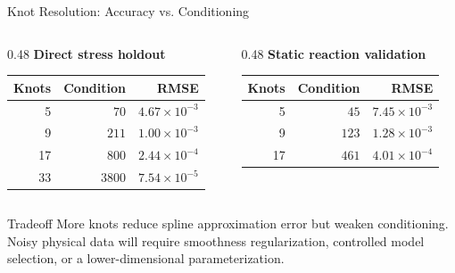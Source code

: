 \documentclass[aspectratio=169,10pt]{beamer}
\begin{document}
\begin{frame}{Knot Resolution: Accuracy vs. Conditioning}
  \small
  \begin{columns}[T,onlytextwidth]
    \begin{column}{0.48\linewidth}
      \centering
      \textbf{Direct stress holdout}

      \vspace{0.3em}
      \begin{tabular}{rrr}
        \toprule
        Knots & Condition & RMSE \\
        \midrule
        5 & $70$ & $4.67\times10^{-3}$ \\
        9 & $211$ & $1.00\times10^{-3}$ \\
        17 & $800$ & $2.44\times10^{-4}$ \\
        33 & $3800$ & $7.54\times10^{-5}$ \\
        \bottomrule
      \end{tabular}
    \end{column}
    \begin{column}{0.48\linewidth}
      \centering
      \textbf{Static reaction validation}

      \vspace{0.3em}
      \begin{tabular}{rrr}
        \toprule
        Knots & Condition & RMSE \\
        \midrule
        5 & $45$ & $7.45\times10^{-3}$ \\
        9 & $123$ & $1.28\times10^{-3}$ \\
        17 & $461$ & $4.01\times10^{-4}$ \\
        \bottomrule
      \end{tabular}
    \end{column}
  \end{columns}

  \vspace{0.9em}
  \begin{alertblock}{Tradeoff}
    More knots reduce spline approximation error but weaken conditioning.
    Noisy physical data will require smoothness regularization, controlled
    model selection, or a lower-dimensional parameterization.
  \end{alertblock}
\end{frame}
\end{document}
